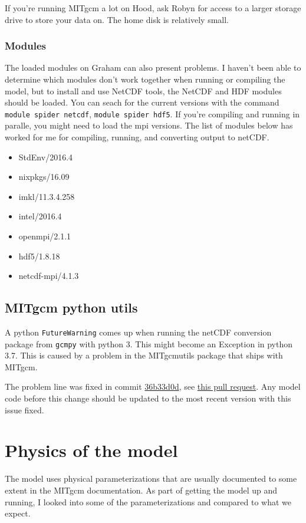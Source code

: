 \documentclass[11pt]{article}
\begin{document}
If you're running MITgcm a lot on Hood, ask Robyn for access to a larger storage drive to store your data on. The home disk is relatively small.

\subsubsection{Modules}
The loaded modules on Graham can also present problems. I haven't been able to determine which modules don't work together when running or compiling the model, but to install and use NetCDF tools, the NetCDF and HDF modules should be loaded. You can seach for the current versions with  the command \verb|module spider netcdf|, \verb|module spider hdf5|. If you're compiling and running in paralle, you might need to load the mpi versions. The list of modules below has worked for me for compiling, running, and converting output to netCDF.

\begin{itemize}
\item{StdEnv/2016.4}
\item{nixpkgs/16.09}
\item{imkl/11.3.4.258}
\item{intel/2016.4}
\item{openmpi/2.1.1}
\item{hdf5/1.8.18}
\item{netcdf-mpi/4.1.3}
\end{itemize}

\subsection{MITgcm python utils}
A python \verb|FutureWarning| comes up when running the netCDF conversion package from \verb|gcmpy| with python 3. This might become an Exception in python 3.7. This is caused by a problem in the MITgcmutils package that ships with MITgcm.

The problem line was fixed in commit \href{https://github.com/MITgcm/MITgcm/commit/36b33d0052b0c72fb6cc21138bf556aa3c96c9f1}{36b33d0d}, see \href{https://github.com/MITgcm/MITgcm/pull/140}{this pull request}. Any model code before this change should be updated to the most recent version with this issue fixed.

\section{Physics of the model}
The model uses physical parameterizations that are usually documented to some extent in the MITgcm documentation. As part of getting the model up and running, I looked into some of the parameterizations and compared to what we expect.
\end{document}
